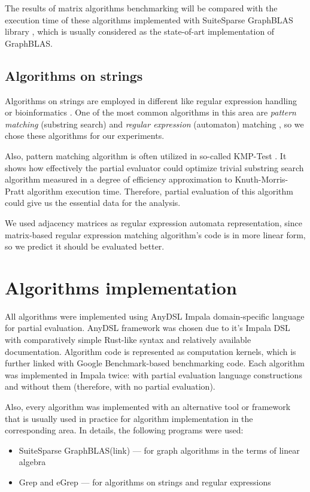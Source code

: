 \documentclass[conference]{IEEEtran}
\begin{document}
The results of matrix algorithms benchmarking will be compared with the execution time of these algorithms implemented with SuiteSparse GraphBLAS library \cite{moreira2018implementing}, which is usually considered as the state-of-art implementation of GraphBLAS.


\subsection{Algorithms on strings}

Algorithms on strings are employed in different like regular expression handling or bioinformatics \cite{rajesh2010unusual}. One of the most common algorithms in this area are \textit{pattern matching} (substring search) and \textit{regular expression} (automaton) matching \cite{cormen2009introduction}, so we chose these algorithms for our experiments.

Also, pattern matching algorithm is often utilized in so-called KMP-Test \cite{jones1993partial}. It shows how effectively the partial evaluator could optimize trivial substring search algorithm measured in a degree of efficiency approximation to Knuth-Morris-Pratt algorithm execution time. Therefore, partial evaluation of this algorithm could give us the essential data for the analysis.

We used adjacency matrices as regular expression automata representation, since matrix-based regular expression matching algorithm's code is in more linear form, so we predict it should be evaluated better.

\section{Algorithms implementation}

All algorithms were implemented using AnyDSL Impala domain-specific language \cite{leissa2018anydsl} for partial evaluation. AnyDSL framework was chosen due to it's Impala DSL with comparatively simple Rust-like syntax and relatively available documentation. Algorithm code is represented as computation kernels, which is further linked with Google Benchmark-based \cite{gbenchmark} benchmarking code. Each algorithm was implemented in Impala twice: with partial evaluation language constructions and without them (therefore, with no partial evaluation).

Also, every algorithm was implemented with an alternative tool or framework that is usually used in practice for algorithm implementation in the corresponding area. In details, the following programs were used:
\begin{itemize}
	\item SuiteSparse GraphBLAS(link) --- for graph algorithms in the terms of linear algebra
	\item Grep and eGrep --- for algorithms on strings and regular expressions
\end{itemize}
\end{document}

